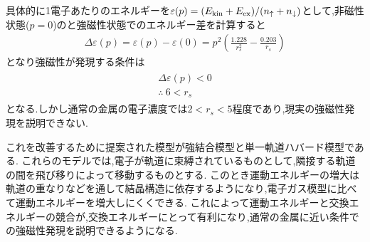 \documentclass[uplatex,a4j,11pt,dvipdfmx]{jsarticle}
\begin{document}
具体的に1電子あたりのエネルギーを$\varepsilon(p)=(E_{\rm kin}+E_{\rm ex})/(n_\uparrow+n_\downarrow)$として,非磁性状態($p=0$)のと強磁性状態でのエネルギー差を計算すると
\begin{align}
  \Delta\varepsilon(p)=\varepsilon(p)-\varepsilon(0)=p^2\left(\frac{1.228}{r_s^2}-\frac{0.203}{r_s}\right)
\end{align}
となり強磁性が発現する条件は
\begin{align}
  \begin{split}
    \Delta\varepsilon(p)<0\\
    \therefore\ 6<r_s
  \end{split}
\end{align}
となる.しかし通常の金属の電子濃度では$2<r_s<5$程度であり,現実の強磁性発現を説明できない.

これを改善するために提案された模型が強結合模型と単一軌道ハバード模型である.
これらのモデルでは,電子が軌道に束縛されているものとして,隣接する軌道の間を飛び移りによって移動するものとする.
このとき運動エネルギーの増大は軌道の重なりなどを通して結晶構造に依存するようになり,電子ガス模型に比べて運動エネルギーを増大しにくくできる.
これによって運動エネルギーと交換エネルギーの競合が,交換エネルギーにとって有利になり,通常の金属に近い条件での強磁性発現を説明できるようになる.

\end{document}
